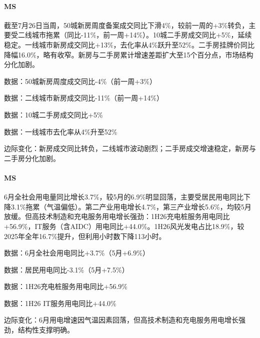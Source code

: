 \documentclass[11pt]{ctexart}
\begin{document}
\paragraph{MS} 截至7月26日当周，50城新房周度备案成交同比下滑4\%，较前一周的+3\%转负，主要受二线城市拖累（同比-11\%，前一周+14\%）。10城二手房成交同比+5\%，延续稳定。一线城市新房成交同比+13\%，去化率从4\%跃升至52\%。二手房挂牌价同比降幅16.0\%，略有收窄。新房与二手房累计增速差距扩大至15个百分点，市场结构分化加剧。
{\small\color{refgray}数据：50城新房周度成交同比-4\%（前一周+3\%）\par}
{\small\color{refgray}数据：二线城市新房成交同比-11\%（前一周+14\%）\par}
{\small\color{refgray}数据：10城二手房成交同比+5\%\par}
{\small\color{refgray}数据：一线城市去化率从4\%升至52\%\par}
{\small\color{refgray}边际变化：新房成交同比转负，二线城市波动剧烈；二手房成交增速稳定，新房与二手房分化加剧。\par}
\paragraph{MS} 6月全社会用电量同比增长3.7\%，较5月的6.9\%明显回落，主要受居民用电同比下降3.1\%拖累（气温偏低）。第二产业用电增长4.7\%，第三产业增长5.6\%，均较5月放缓。但高技术制造和充电服务用电增长强劲：1H26充电桩服务用电同比+56.9\%，IT服务（含AIDC）用电同比+44.0\%。1H26风光发电占比18.9\%，较2025年全年16.7\%提升，但利用小时数下降113小时。
{\small\color{refgray}数据：6月全社会用电同比+3.7\%（5月+6.9\%）\par}
{\small\color{refgray}数据：居民用电同比-3.1\%（5月+7.5\%）\par}
{\small\color{refgray}数据：1H26充电桩服务用电同比+56.9\%\par}
{\small\color{refgray}数据：1H26 IT服务用电同比+44.0\%\par}
{\small\color{refgray}边际变化：6月用电增速因气温因素回落，但高技术制造和充电服务用电增长强劲，结构性支撑明确。\par}
\end{document}
